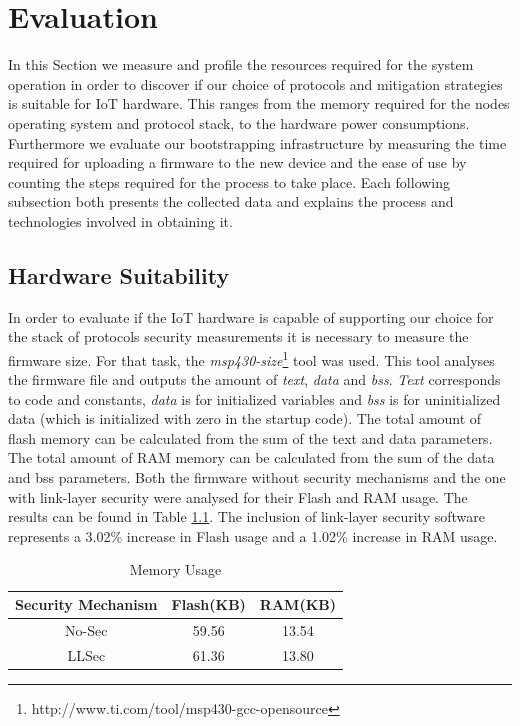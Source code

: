 
\chapter{Evaluation}
\label{chapter:evaluation}

In this Section we measure and profile the resources required for the system operation in order to discover if our choice of protocols and mitigation strategies is suitable for \gls{IoT} hardware. 
This ranges from the memory required for the nodes operating system and protocol stack, to the hardware power consumptions. 
Furthermore we evaluate our bootstrapping infrastructure by measuring the time required for uploading a firmware to the new device and the ease of use by counting the steps required for the process to take place. 
Each following subsection both presents the collected data and explains the process and technologies involved in obtaining it.

\section{Hardware Suitability}
In order to evaluate if the \gls{IoT} hardware is capable of supporting our choice for the stack of protocols security measurements it is necessary to measure the firmware size. 
For that task, the \textit{msp430-size}\footnote{http://www.ti.com/tool/msp430-gcc-opensource} tool was used. 
This tool analyses the firmware file and outputs the amount of \textit{text}, \textit{data} and \textit{bss}.
\textit{Text} corresponds to code and constants, \textit{data} is for initialized variables and \textit{bss} is for uninitialized data (which is initialized with zero in the startup code).
The total amount of flash memory can be calculated from the sum of the text and data parameters.
The total amount of \gls{RAM} memory can be calculated from the sum of the data and bss parameters.
Both the firmware without security mechanisms and the one with link-layer security were analysed for their Flash and RAM usage. 
The results can be found in Table \ref{tab:space_req}. The inclusion of link-layer security software represents a 3.02\% increase in Flash usage and a 1.02\% increase in RAM usage.

\begin{table}
\centering
\caption{Memory Usage}
\label{tab:space_req}
\begin{tabular}{|c|c|c|} \hline
Security Mechanism&Flash(KB)&RAM(KB)\\ \hline
No-Sec& 59.56& 13.54\\ \hline
LLSec& 61.36& 13.80\\ %
\hline\end{tabular}
\end{table}

